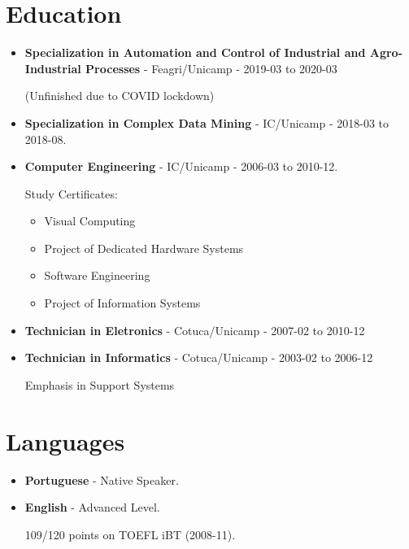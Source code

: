 \documentclass[a4paper,10pt]{article}
\begin{document}
  \section{Education}
    \begin{itemize}
      \item
        \textbf{Specialization in Automation and Control of Industrial and Agro-Industrial Processes} - Feagri/Unicamp - 2019-03 to 2020-03

        (Unfinished due to COVID lockdown)

      \item
        \textbf{Specialization in Complex Data Mining} - IC/Unicamp - 2018-03 to 2018-08.

      \item  
        \textbf{Computer Engineering} - IC/Unicamp - 2006-03 to 2010-12.


        Study Certificates:
        \begin{itemize}
          \item Visual Computing
          \item Project of Dedicated Hardware Systems
          \item Software Engineering
          \item Project of Information Systems
        \end{itemize}


      \item  
        \textbf{Technician in Eletronics} - Cotuca/Unicamp - 2007-02 to 2010-12


      \item  
        \textbf{Technician in Informatics} - Cotuca/Unicamp - 2003-02 to 2006-12

        Emphasis in Support Systems


    \end{itemize}



  \section{Languages}
    \begin{itemize}

      \item
        \textbf{Portuguese} - Native Speaker.

      \item
        \textbf{English} - Advanced Level.

        109/120 points on TOEFL iBT (2008-11).

    \end{itemize}
\end{document}
